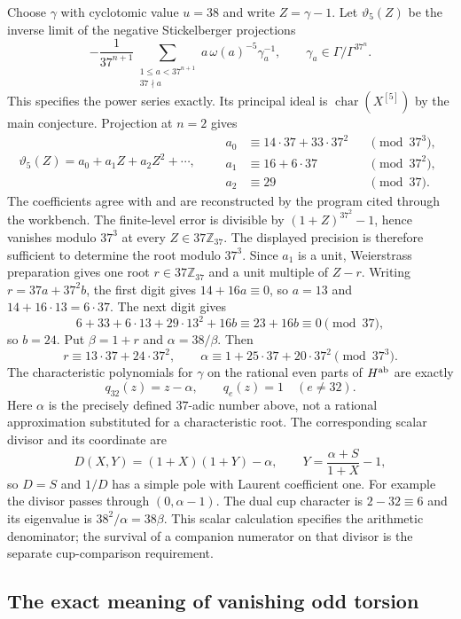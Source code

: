 \documentclass[11pt]{article}
\theoremstyle{definition}\newtheorem{definition}[theorem]{Definition}
\newcommand{\Z}{\mathbb Z}\newcommand{\Q}{\mathbb Q}
\begin{document}
Choose $\gamma$ with cyclotomic value $u=38$ and write $Z=\gamma-1$.
Let $\vartheta_5(Z)$ be the inverse limit of the negative
Stickelberger projections
\[
 -\frac1{37^{n+1}}
 \sum_{\substack{1\leq a<37^{n+1}\\37\nmid a}}
 a\,\omega(a)^{-5}\gamma_a^{-1},
 \qquad
 \gamma_a\in\Gamma/\Gamma^{37^n}.
\]
This specifies the power series exactly. Its principal ideal is
$\operatorname{char}(X^{[5]})$ by the main conjecture.
Projection at $n=2$ gives
\[
 \vartheta_5(Z)=a_0+a_1Z+a_2Z^2+\cdots,
 \qquad
 \begin{aligned}
 a_0&\equiv14\cdot37+33\cdot37^2&&\pmod{37^3},\\
 a_1&\equiv16+6\cdot37&&\pmod{37^2},\\
 a_2&\equiv29&&\pmod{37}.
 \end{aligned}
\]
The coefficients agree with \cite[\S1.9, p.~8]{Wuthrich} and are
reconstructed by the program cited through the workbench.
The finite-level error is divisible by $(1+Z)^{37^2}-1$, hence
vanishes modulo $37^3$ at every $Z\in37\Z_{37}$.
The displayed precision is therefore sufficient to determine the root
modulo $37^3$. Since $a_1$ is a unit, Weierstrass preparation gives
one root $r\in37\Z_{37}$ and a unit multiple of $Z-r$.
Writing $r=37a+37^2b$, the first digit gives $14+16a\equiv0$, so
$a=13$ and $14+16\cdot13=6\cdot37$. The next digit gives
\[
 6+33+6\cdot13+29\cdot13^2+16b
       \equiv23+16b\equiv0\pmod{37},
\]
so $b=24$. Put $\beta=1+r$ and $\alpha=38/\beta$. Then
\[
 r\equiv13\cdot37+24\cdot37^2,\qquad
 \alpha\equiv1+25\cdot37+20\cdot37^2\pmod{37^3}.
\]
The characteristic polynomials for $\gamma$ on the rational even
parts of $H^{\rm ab}$ are exactly
\[
 q_{32}(z)=z-\alpha,\qquad q_e(z)=1\quad(e\ne32).
\]
Here $\alpha$ is the precisely defined $37$-adic number above,
not a rational approximation substituted for a characteristic root.
The corresponding scalar divisor and its coordinate are
\[
 D(X,Y)=(1+X)(1+Y)-\alpha,\qquad
 Y=\frac{\alpha+S}{1+X}-1,
\]
so $D=S$ and $1/D$ has a simple pole with Laurent coefficient one.
For example the divisor passes through $(0,\alpha-1)$.
The dual cup character is $2-32\equiv6$ and its eigenvalue is
$38^2/\alpha=38\beta$. This scalar calculation specifies the
arithmetic denominator; the survival of a companion numerator
on that divisor is the separate cup-comparison requirement.

\subsection{The exact meaning of vanishing odd torsion}
\label{subsec:odd-torsion-plus-adjoint}
\end{document}
